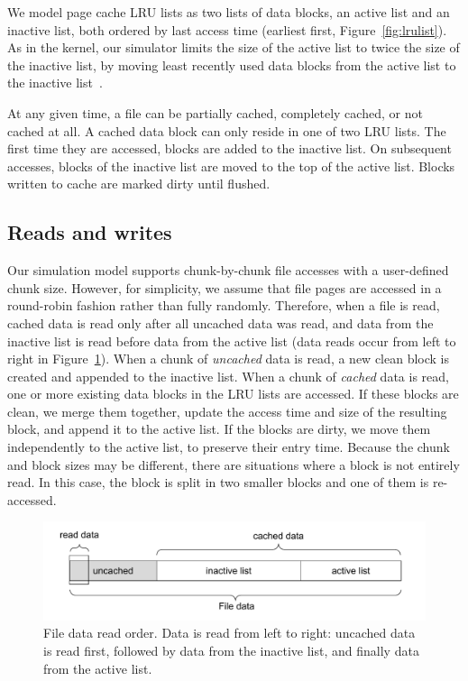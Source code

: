 We model page cache LRU lists as
two lists of data blocks, an active list and an inactive list, both ordered by
last access time (earliest first, Figure~\ref{fig:lrulist}).
As in the kernel, our simulator limits the size of the active list to
twice the size of the inactive list, by moving least recently
used data blocks from the active list to the inactive list~\cite{gorman2004understanding, linuxdev3rd2010}.

At any given time, a file can be partially cached, completely cached,
or not cached at all. A cached data block can only reside in one of two
LRU lists. The first time they are accessed, blocks are
added to the inactive list. On subsequent accesses, blocks of the
inactive list are moved to the top of the active list. Blocks
written to cache are marked dirty until flushed.

\subsection{Reads and writes}

Our simulation model supports chunk-by-chunk file accesses
with a user-defined chunk size. However, for simplicity, we assume that file pages are
accessed in a round-robin fashion rather than fully randomly.
Therefore, when a file is read, cached data is read only after all uncached data was read, and data from the inactive list is read
before data from the active list
(data reads occur from left to right in Figure~\ref{fig:read_order}).
When a chunk of \emph{uncached} data is read, a new clean block is created
and appended to the inactive list.
When a chunk of \emph{cached} data is read, one or more existing data blocks in the LRU lists are accessed.
If these blocks are clean, we merge them together, update the access time and size of the resulting block,
and append it to the active list.
If the blocks are dirty, we move them independently to the active list, to preserve their entry time.
Because the chunk and block sizes may be different, there are situations
where a block is not entirely read.
In this case, the block is split in two smaller blocks and one of them is re-accessed.

\begin{figure}
       \centering
       \includegraphics[width=0.8\columnwidth]{figures/read_order.pdf}
       \caption{File data read order. Data is read from left to right: uncached data
       is read first, followed by data from the inactive list, and finally data from the active list. }
       \label{fig:read_order}
\end{figure}

